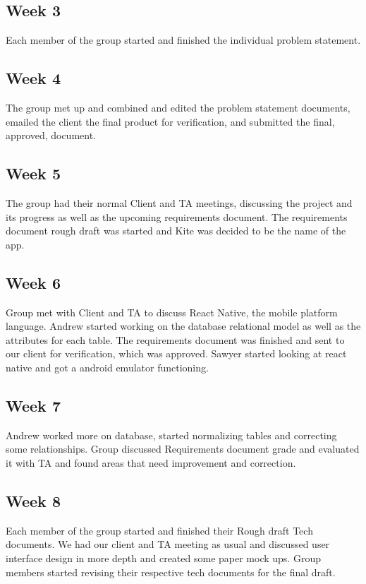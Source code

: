 \documentclass[compsoc, 10, draftclsnofoot, onecolumn]{IEEEtran}
\begin{document}
\subsection{Week 3} Each member of the group started and finished the individual problem statement. 

\subsection{Week 4} The group met up and combined and edited the problem statement documents, emailed the client the final product for verification, and submitted the final, approved, document.     

\subsection{Week 5} The group had their normal Client and TA meetings, discussing the project and its progress as well as the upcoming requirements document. The requirements document rough draft was started and Kite was decided to be the name of the app.

\subsection{Week 6} Group met with Client and TA to discuss React Native, the mobile platform language. Andrew started working on the database relational model as well as the attributes for each table. The requirements document was finished and sent to our client for verification, which was approved. Sawyer started looking at react native and got a android emulator functioning.  

\subsection{Week 7} Andrew worked more on database, started normalizing tables and correcting some relationships. Group discussed Requirements document grade and evaluated it with TA and found areas that need improvement and correction.  

\subsection{Week 8} Each member of the group started and finished their Rough draft Tech documents. We had our client and TA meeting as usual and discussed user interface design in more depth and created some paper mock ups. Group members started revising their respective tech documents for the final draft.  
\end{document}
